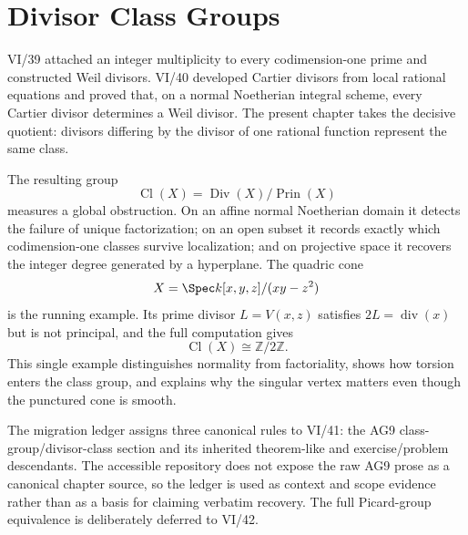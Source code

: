 \chapter{Divisor Class Groups}
\label{ch:vi41-divisor-class-groups}
\providecommand{\Cl}{\operatorname{Cl}}
\providecommand{\Div}{\operatorname{Div}}
\providecommand{\Prin}{\operatorname{Prin}}
\providecommand{\CaDiv}{\operatorname{CaDiv}}
\providecommand{\Pic}{\operatorname{Pic}}

VI/39 attached an integer multiplicity to every codimension-one prime and constructed Weil divisors. VI/40 developed Cartier divisors from local rational equations and proved that, on a normal Noetherian integral scheme, every Cartier divisor determines a Weil divisor. The present chapter takes the decisive quotient: divisors differing by the divisor of one rational function represent the same class.

The resulting group
\[
  \Cl(X)=\Div(X)/\Prin(X)
\]
measures a global obstruction. On an affine normal Noetherian domain it detects the failure of unique factorization; on an open subset it records exactly which codimension-one classes survive localization; and on projective space it recovers the integer degree generated by a hyperplane. The quadric cone
\[
  X=\Spec k[x,y,z]/(xy-z^2)
\]
is the running example. Its prime divisor \(L=V(x,z)\) satisfies \(2L=\operatorname{div}(x)\) but is not principal, and the full computation gives
\[
  \Cl(X)\cong \mathbb Z/2\mathbb Z.
\]
This single example distinguishes normality from factoriality, shows how torsion enters the class group, and explains why the singular vertex matters even though the punctured cone is smooth.

The migration ledger assigns three canonical rules to VI/41: the AG9 class-group/divisor-class section and its inherited theorem-like and exercise/problem descendants. The accessible repository does not expose the raw AG9 prose as a canonical chapter source, so the ledger is used as context and scope evidence rather than as a basis for claiming verbatim recovery. The full Picard-group equivalence is deliberately deferred to VI/42.

